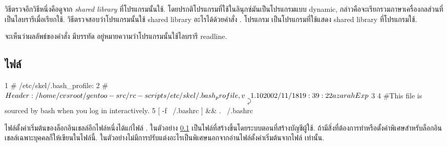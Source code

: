 \begin{thwbr}
วิธีตรวจอีกวิธีหนึ่งคือดูจาก \emph{shared library} ที่โปรแกรมนั้นใช้. โดยปรกติโปรแกรมที่ใช้ในลินุกซ์มันเป็นโปรแกรมแบบ dynamic, กล่าวคือจะเรียกรวมภาษาเครื่องกลส่วนที่เป็นไลบรารีเมื่อเรียกใช้. วิธีตรวจสอบว่าโปรแกรมนั้นใช้ shared library อะไรได้ด้วยคำสั่ง . โปรแกรม  เป็นโปรแกรมที่ใช้แสดง shared library ที่โปรแกรมใช้.  
\begin{MyExample}
\end{MyExample}%
จะเห็นว่าผลลัพธ์ของคำสั่ง  มีบรรทัด  อยู่หมายความว่าโปรแกรมนั้นใช้ไลบรารี readline.

\subsection{ไฟล์ }\label{ex:bashprofile}
\begin{MyExample}
\begin{MyEx}
     1  # /etc/skel/.bash_profile:
     2  # $Header: /home/cvsroot/gentoo-src/rc-scripts/etc/skel/.bash_profile,v 2002/11/18 19:39:22 azarah Exp $
     3
     4  #This file is sourced by bash when you log in interactively.
     5  [ -f ~/.bashrc ] && . ~/.bashrc
\end{MyEx}
\end{MyExample}

ไฟล์ตั้งค่าเริ่มต้นของล็อกอินเชลล์อีกไฟล์หนึ่งได้แก่ไฟล์ . ในตัวอย่าง \ref{ex:bashprofile} เป็นไฟล์ที่สร้างขึ้นโดยระบบตอนที่สร้างบัญชีผู้ใช้. ถ้ามีสิ่งที่ต้องการทำหรือตั้งค่าพิเศษสำหรับล็อกอินเชลล์เฉพาะบุคคลก็ให้เขียนในไฟล์นี้. ในตัวอย่างไม่มีการปรับแต่งอะไรเป็นพิเศษนอกจากอ่านไฟล์ตั้งค่าเริ่มต้นจากไฟล์  เท่านั้น. 


\end{thwbr}
